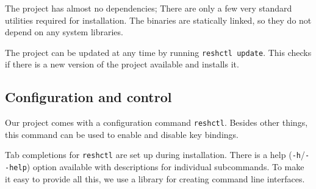 The project has almost no dependencies; There are only a few very standard utilities required for installation. The binaries are statically linked, so they do not depend on any system libraries.

The project can be updated at any time by running \verb|reshctl update|. This checks if there is a new version of the project available and installs it.

\subsection{Configuration and control}

Our project comes with a configuration command \verb|reshctl|. Besides other things, this command can be used to enable and disable key bindings. 

Tab completions for \verb|reshctl| are set up during installation. There is a help (\verb|-h|/\verb|--help|) option available with descriptions for individual subcommands. To make it easy to provide all this, we use a library\cite{lib-go-cobra} for creating command line interfaces.
